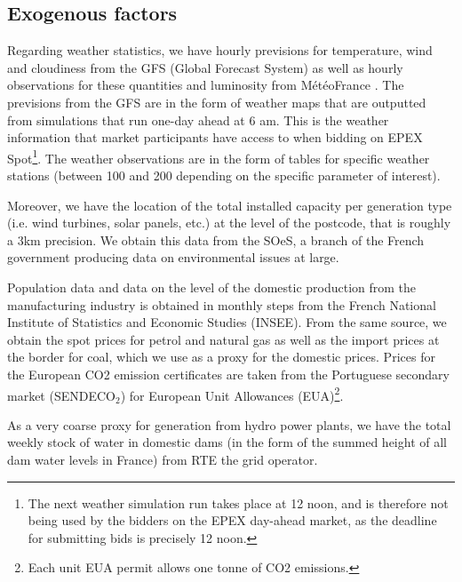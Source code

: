 \subsection*{Exogenous factors}

Regarding weather statistics, we have hourly previsions for temperature, wind and cloudiness from the GFS (Global Forecast System) as well as hourly observations for these quantities and luminosity from M\'{e}t\'{e}oFrance
. The previsions from the GFS are in the form of weather maps that are outputted from simulations that run one-day ahead at 6 am. This is the weather information that market participants have access to when bidding on EPEX Spot\footnote{The next weather simulation run takes place at 12 noon, and is therefore not being used by the bidders on the EPEX day-ahead market, as the deadline for submitting bids is precisely 12 noon.}. The weather observations are in the form of tables for specific weather stations (between 100 and 200 depending on the specific parameter of interest).

Moreover, we have the location of the total installed capacity per generation type (i.e. wind turbines, solar panels, etc.) at the level of the postcode, that is roughly a 3km precision. We obtain this data from the SOeS, a branch of the French government producing data on environmental issues at large. 

Population data and data on the level of the domestic production from the manufacturing industry is obtained in monthly steps from the French National Institute of Statistics and Economic Studies (INSEE). From the same source, we obtain the spot prices for petrol and natural gas as well as the import prices at the border for coal, which we use as a proxy for the domestic prices. 
Prices for the European CO2 emission certificates are taken from the Portuguese secondary market (SENDECO$_2$) for European Unit Allowances (EUA)\footnote{Each unit EUA permit allows one tonne of CO2 emissions.}.

As a very coarse proxy for generation from hydro power plants, we have the total weekly stock of water in domestic dams (in the form of the summed height of all dam water levels in France) from RTE the grid operator.









